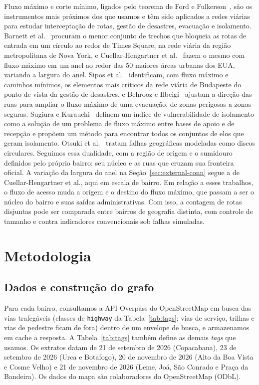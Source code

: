 Fluxo máximo e corte mínimo, ligados pelo teorema de Ford e
Fulkerson~\cite{ford1956maximal}, são os instrumentos mais próximos dos que
usamos e têm sido aplicados a redes viárias para estudar interceptação de
rotas, gestão de desastres, evacuação e isolamento. Barnett et
al.~\cite{barnett2007maxflow} procuram o menor conjunto de trechos que bloqueia
as rotas de entrada em um círculo ao redor de Times Square, na rede viária da
região metropolitana de Nova York, e Cuellar-Hengartner et
al.~\cite{cuellar2015checkpoints} fazem o mesmo com fluxo máximo em um anel ao
redor das 50 maiores áreas urbanas dos EUA, variando a largura do anel. Sipos
et al.~\cite{sipos2023disaster} identificam, com fluxo máximo e caminhos
mínimos, os elementos mais críticos da rede viária de Budapeste do ponto de
vista da gestão de desastres, e Behrooz e Ilbeigi~\cite{behrooz2025adaptive}
ajustam a direção das ruas para ampliar o fluxo máximo de uma evacuação, de
zonas perigosas a zonas seguras. Sugiura e Kurauchi~\cite{sugiura2023isolation}
definem um índice de vulnerabilidade de isolamento como a solução de um
problema de fluxo máximo entre bases de apoio e de recepção e propõem um método
para encontrar todos os conjuntos de elos que geram isolamento. Otsuki et
al.~\cite{otsuki2016improved} tratam falhas geográficas modeladas como discos
circulares. Seguimos essa dualidade, com a região de origem e o sumidouro
definidos pelo próprio bairro: seu núcleo e as ruas que cruzam sua fronteira
oficial. A variação da largura do anel na Seção~\ref{sec:external-conn} segue a
de Cuellar-Hengartner et al., aqui em escala de bairro. Em relação a esses
trabalhos, o fluxo de acesso muda a origem e o destino do fluxo máximo, que
passam a ser o núcleo do bairro e suas saídas administrativas. Com isso, a
contagem de rotas disjuntas pode ser comparada entre bairros de geografia
distinta, com controle de tamanho e contra indicadores convencionais sob falhas
simuladas.

\section{Metodologia}
\label{sec:method}

\subsection{Dados e construção do grafo}
\label{sec:data}

Para cada bairro, consultamos a API Overpass do OpenStreetMap em busca
das vias trafegáveis (classes de \texttt{highway} da
Tabela~\ref{tab:tags}; vias de serviço, trilhas e vias de pedestre ficam de
fora) dentro de um envelope de busca, e armazenamos em cache a resposta.
A Tabela~\ref{tab:tags} também define as demais \emph{tags} que usamos.
Os extratos datam de 21 de setembro de 2026 (Copacabana), 23 de setembro de
2026 (Urca e Botafogo), 20 de novembro de 2026 (Alto da Boa Vista e Cosme
Velho) e 21 de novembro de 2026 (Leme, Joá, São Conrado e Praça da Bandeira).
Os dados do mapa são \textcopyright{} colaboradores do OpenStreetMap (ODbL).

